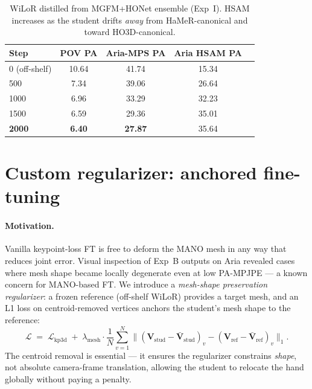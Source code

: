 \documentclass{article}
\begin{document}
\begin{table}[h]
\centering
\small
\caption{WiLoR distilled from MGFM+HONet ensemble (Exp~I). HSAM increases as the student drifts \emph{away} from HaMeR-canonical and toward HO3D-canonical.}
\label{tab:distill}
\begin{tabular}{lcccc}
\toprule
\textbf{Step} & \textbf{POV PA} & \textbf{Aria-MPS PA} & \textbf{Aria HSAM PA} \\
\midrule
0 (off-shelf) & 10.64 & 41.74 & 15.34 \\
500            & 7.34  & 39.06 & 26.64 \\
1000           & 6.96  & 33.29 & 32.23 \\
1500           & 6.59  & 29.36 & 35.01 \\
\textbf{2000}  & \textbf{6.40} & \textbf{27.87} & 35.64 \\
\bottomrule
\end{tabular}
\end{table}

\section{Custom regularizer: anchored fine-tuning}
\label{sec:anchor}

\paragraph{Motivation.}
Vanilla keypoint-loss FT is free to deform the MANO mesh in any way that reduces joint error. Visual inspection of Exp~B outputs on Aria revealed cases where mesh shape became locally degenerate even at low PA-MPJPE — a known concern for MANO-based FT. We introduce a \emph{mesh-shape preservation regularizer}: a frozen reference (off-shelf WiLoR) provides a target mesh, and an L1 loss on centroid-removed vertices anchors the student's mesh shape to the reference:
\begin{equation}
\mathcal{L} \;=\; \mathcal{L}_{\text{kp3d}} \;+\; \lambda_{\text{mesh}} \cdot \frac{1}{N}\sum_{v=1}^{N} \big\| (\mathbf{V}_{\text{stud}} - \bar{\mathbf{V}}_{\text{stud}})_v - (\mathbf{V}_{\text{ref}} - \bar{\mathbf{V}}_{\text{ref}})_v \big\|_1.
\end{equation}
The centroid removal is essential — it ensures the regularizer constrains \emph{shape}, not absolute camera-frame translation, allowing the student to relocate the hand globally without paying a penalty.
\end{document}

